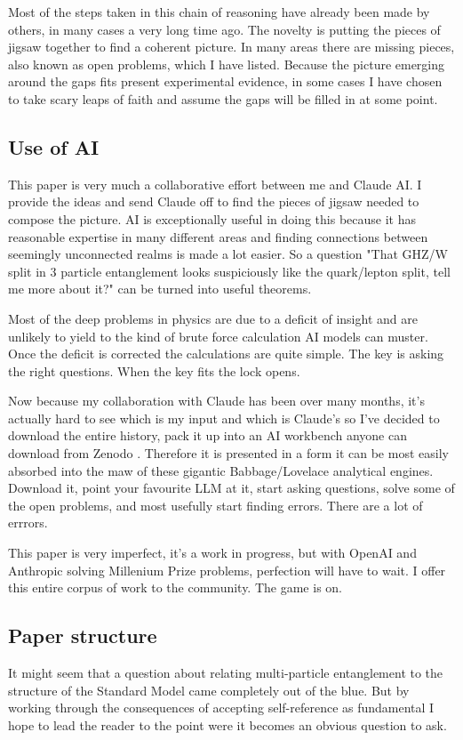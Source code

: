 \documentclass{article}
\theoremstyle{plain}
\theoremstyle{definition}
\theoremstyle{remark}\newtheorem*{remark}{Remark}
\begin{document}
Most of the steps taken in this chain of reasoning have already been made by others, in many
cases a very long time ago. The novelty is putting the pieces of jigsaw together to find a
coherent picture. In many areas there are missing pieces, also known as open problems, which I
have listed. Because the picture emerging around the gaps fits present experimental evidence, in
some cases I have chosen to take scary leaps of faith and assume the gaps will be filled in at some point.

\subsection{Use of AI}
This paper is very much a collaborative effort between me and Claude AI. I provide the ideas and
send Claude off to find the pieces of jigsaw needed to compose the picture. AI is exceptionally
useful in doing this because it has reasonable expertise in many different areas and finding
connections between seemingly unconnected realms is made a lot easier. So a question "That GHZ/W
split in 3 particle entanglement looks suspiciously like the quark/lepton split, tell me more
about it?" can be turned into useful theorems.

Most of the deep problems in physics are due to a deficit of insight and are unlikely to yield
to the kind of brute force calculation AI models can muster. Once the deficit is corrected the
calculations are quite simple. The key is asking the right questions. When the key fits the
lock opens. 

Now because my collaboration with Claude has been over many months, it's actually hard to see
which is my input and which is Claude's so I've decided to download the entire history, pack it
up into an AI workbench anyone can download from Zenodo \autocite{small2026itfrombit}. Therefore it is presented in a
form it can be most easily absorbed into the maw of these gigantic Babbage/Lovelace analytical
engines. Download it, point your favourite LLM at it, start asking questions, solve some of
the open problems, and most usefully start finding errors. There are a lot of errrors.

This paper is very imperfect, it's a work in progress, but with OpenAI and Anthropic solving
Millenium Prize problems, perfection will have to wait. I offer this entire corpus of work to
the community. The game is on.

\subsection{Paper structure}
It might seem that a question about relating multi-particle entanglement to the structure of the
Standard Model came completely out of the blue. But by working through the consequences of 
accepting self-reference as fundamental I hope to lead the reader to the point were it 
becomes an obvious question to ask.
\end{document}

